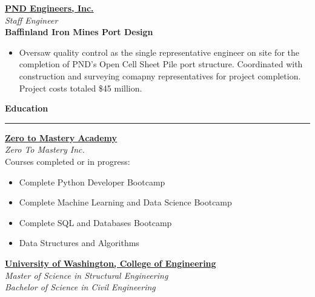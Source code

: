 \documentclass[letterpaper,6pt]{article}
\newcommand{\ts}{\textsuperscript}
\begin{document}
\vspace{3mm}
\href{https://www.pndengineers.com}{\textbf{PND Engineers, Inc.}} \\
\textit{Staff Engineer} \\
\textbf{\small{Baffinland Iron Mines Port Design}}
\begin{itemize}[itemsep=0.5mm,topsep=0pt]
    \item  Oversaw quality control as the single representative engineer on site for 
    the completion of PND's Open Cell Sheet Pile\ts{\textregistered} port structure. 
    Coordinated with construction and surveying comapny representatives for project
    completion. Project costs totaled \$45 million.
    \end{itemize}
    
\vspace{5mm}
{\large \textbf{Education}}
\vspace{0.5mm}
\hrule
\vspace{2mm}
\href{https://zerotomastery.io}{\textbf{Zero to Mastery Academy}} \\
\textit{Zero To Mastery Inc.} \\
Courses completed or in progress: 
\begin{itemize}[itemsep=0.5mm,topsep=0pt]
   \item Complete Python Developer Bootcamp
\end{itemize}
\begin{itemize}[itemsep=0.5mm,topsep=0pt]
   \item Complete Machine Learning and Data Science Bootcamp
\end{itemize}
\begin{itemize}[itemsep=0.5mm,topsep=0pt]
   \item Complete SQL and Databases Bootcamp
\end{itemize}
\begin{itemize}[itemsep=0.5mm,topsep=0pt]
   \item Data Structures and Algorithms
\end{itemize}

\vspace{3mm}
\href{https://www.ce.washington.edu}{\textbf{University of Washington, College of Engineering}} \\
\textit{Master of Science in Structural Engineering} \\
\textit{Bachelor of Science in Civil Engineering}
\end{document}
